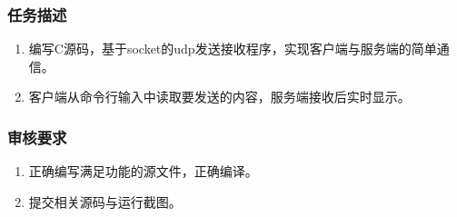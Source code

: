 \documentclass{article}
\begin{document}
\subsubsection{任务描述}
\begin{enumerate}
    \item 编写C源码，基于socket的udp发送接收程序，实现客户端与服务端的简单通信。
    \item 客户端从命令行输入中读取要发送的内容，服务端接收后实时显示。
\end{enumerate}

\subsubsection{审核要求}
\begin{enumerate}
    \item 正确编写满足功能的源文件，正确编译。
    \item 提交相关源码与运行截图。
\end{enumerate}
\end{document}
